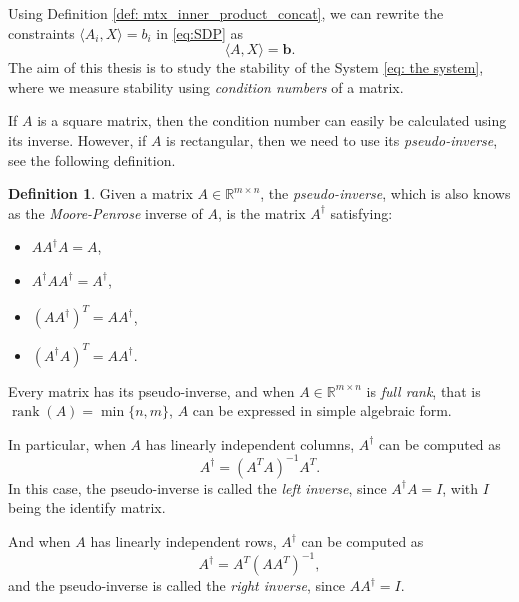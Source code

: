 \documentclass[12pt]{amsart}
\numberwithin{equation}{section}
\theoremstyle{definition}
\newtheorem{definition}[thm]{Definition}
\numberwithin{thm}{section}
\DeclareMathOperator{\rank}{rank}
\begin{document}

\smallskip

Using Definition \ref{def: mtx_inner_product_concat}, we can rewrite the constraints $\langle A_i, X \rangle = b_i$ in \eqref{eq:SDP} as 
\begin{equation}
     \label{eq: the system}
     \langle A, X \rangle = \mathbf{b}.
\end{equation}
The aim of this thesis is to study the stability of the System \eqref{eq: the system},
where we measure stability using \emph{condition numbers} of a matrix.

If $A$ is a square matrix, then the condition number can easily be calculated using its inverse. 
However, if $A$ is rectangular, then we need to use its \emph{pseudo-inverse}, see the following definition.

\begin{definition}
     Given a matrix $A \in \mathbb{R}^{m \times n}$, the \emph{pseudo-inverse},
     which is also knows as the \emph{Moore-Penrose} inverse of $A$, is the matrix
     $A^\dagger$ satisfying:
     \begin{itemize}
          \item $A A^\dagger A = A$,
          \item $A^\dagger A A^\dagger = A^\dagger$,
          \item $(A A^\dagger)^T = A A^\dagger$,
          \item $(A^\dagger A)^T = A A^\dagger$.
        \end{itemize}
\end{definition}

Every matrix has its pseudo-inverse, and when $A \in \mathbb{R}^{m \times n}$ is \emph{full rank}, 
that is $\rank(A) = \min\{n, m\}$, $A$ can be expressed in simple algebraic form.

In particular, when $A$ has linearly independent columns, $A^\dagger$ can be computed as
\begin{equation*}
     A^\dagger = (A^T A)^{-1} A^T.
\end{equation*}
In this case, the pseudo-inverse is called the \emph{left inverse}, since $A^\dagger A = I$, with $I$ being the identify matrix.

\smallskip
And when $A$ has linearly independent rows, $A^\dagger$ can be computed as
\begin{equation*}
     A^\dagger = A^T (A A^T)^{-1},
\end{equation*}
and the pseudo-inverse is called the \emph{right inverse}, since $A A^\dagger = I$. 
\end{document}
